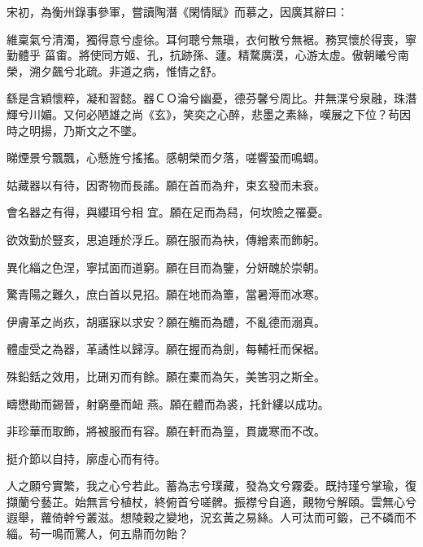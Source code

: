 \begin{pinyinscope}
 宋初，為衡州錄事參軍，嘗讀陶潛《閑情賦》而慕之，因廣其辭曰：



 維稟氣兮清濁，獨得意兮虛徐。耳何聰兮無瑱，衣何散兮無裾。務冥懷於得喪，寧勤體乎
 菑畬。將使同方姬、孔，抗跡孫、蘧。精騖廣漠，心游太虛。傲朝曦兮南榮，溯夕飆兮北疏。非道之病，惟情之舒。



 繇是含穎懷粹，凝和習懿。器ＣＯ淪兮幽憂，德芬馨兮周比。井無渫兮泉融，珠潛輝兮川媚。又何必陋雄之尚《玄》，笑奕之心醉，悲墨之素絲，嘆展之下位？茍因時之明揚，乃斯文之不墜。



 睇煙景兮飄飄，心懸旌兮搖搖。感朝榮而夕落，嗟響蛩而鳴蜩。



 姑藏器以有待，因寄物而長謠。願在首而為弁，束玄發而未衰。



 會名器之有得，與纓珥兮相
 宜。願在足而為舄，何坎險之罹憂。



 欲效勤於豎亥，思追踵於浮丘。願在服而為袂，傳繒素而飾躬。



 異化緇之色涅，寧拭面而道窮。願在目而為鑒，分妍醜於崇朝。



 驚青陽之難久，庶白首以見招。願在地而為簟，當暑溽而冰寒。



 伊膚革之尚疚，胡寤寐以求安？願在觴而為醴，不亂德而溺真。



 體虛受之為器，革譎性以歸淳。願在握而為劍，每輔衽而保裾。



 殊鉛銛之效用，比硎刃而有餘。願在橐而為矢，美筈羽之斯全。



 疇懋勛而錫晉，射窮壘而衄
 燕。願在體而為裘，托針縷以成功。



 非珍華而取飾，將被服而有容。願在軒而為篁，貫歲寒而不改。



 挺介節以自持，廓虛心而有待。



 人之願兮實繁，我之心兮若此。蓄為志兮璞藏，發為文兮霧委。既持瑾兮掌瑜，復擷蘭兮藝芷。始無言兮植杖，終俯首兮嗟髀。振襟兮自適，覿物兮解頤。雲無心兮遐舉，蘿倚幹兮叢滋。想陵穀之變地，況玄黃之易絲。人可汰而可鍛，己不磷而不緇。茍一鳴而驚人，何五鼎而勿飴？




\end{pinyinscope}

